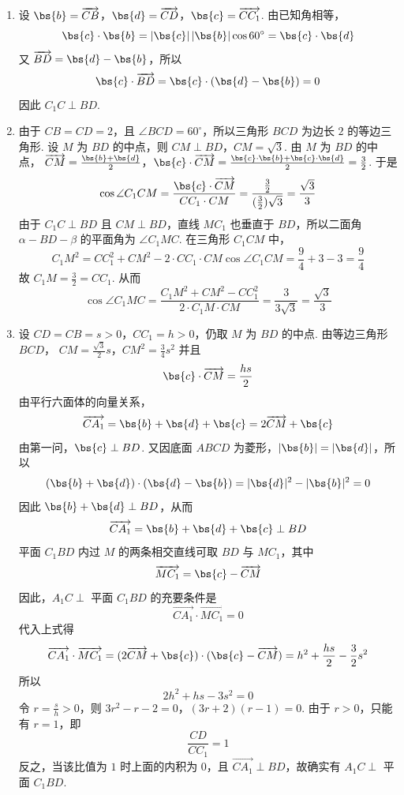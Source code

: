 \begin{solution}
\begin{enumerate}
\item 设 \(\bs{b}=\overrightarrow{CB}\)，\(\bs{d}=\overrightarrow{CD}\)，\(\bs{c}=\overrightarrow{CC_1}\). 由已知角相等，
\[
\bs{c}\cdot\bs{b}=|\bs{c}|\,|\bs{b}|\cos60^\circ=\bs{c}\cdot\bs{d}
\]
又 \(\overrightarrow{BD}=\bs{d}-\bs{b}\)，所以
\[
\bs{c}\cdot\overrightarrow{BD}=\bs{c}\cdot(\bs{d}-\bs{b})=0
\]
因此 \(C_1C\perp BD\).

\item 由于 \(CB=CD=2\)，且 \(\angle BCD=60^\circ\)，所以三角形 \(BCD\) 为边长 \(2\) 的等边三角形. 设 \(M\) 为 \(BD\) 的中点，则
\(CM\perp BD\)，\(CM=\sqrt{3}\).
由 \(M\) 为 \(BD\) 的中点，
\(\overrightarrow{CM}=\frac{\bs{b}+\bs{d}}{2}\)，\(\bs{c}\cdot\overrightarrow{CM}=\frac{\bs{c}\cdot\bs{b}+\bs{c}\cdot\bs{d}}{2}=\frac{3}{2}\).
于是
\[
\cos\angle C_1CM=\frac{\bs{c}\cdot\overrightarrow{CM}}{CC_1\cdot CM}
=\frac{\frac{3}{2}}{(\frac{3}{2})\sqrt{3}}=\frac{\sqrt{3}}{3}
\]
由于 \(C_1C\perp BD\) 且 \(CM\perp BD\)，直线 \(MC_1\) 也垂直于 \(BD\)，所以二面角 \(\alpha-BD-\beta\) 的平面角为 \(\angle C_1MC\). 在三角形 \(C_1CM\) 中，
\[
C_1M^2=CC_1^2+CM^2-2\cdot CC_1\cdot CM\cos\angle C_1CM
=\frac94+3-3=\frac94
\]
故 \(C_1M=\frac32=CC_1\). 从而
\[
\cos\angle C_1MC=\frac{C_1M^2+CM^2-CC_1^2}{2\cdot C_1M\cdot CM}
=\frac{3}{3\sqrt{3}}=\frac{\sqrt{3}}{3}
\]

\item 设 \(CD=CB=s>0\)，\(CC_1=h>0\)，仍取 \(M\) 为 \(BD\) 的中点. 由等边三角形 \(BCD\)，
\(CM=\frac{\sqrt{3}}{2}s\)，\(CM^2=\frac34s^2\)
并且
\[
\bs{c}\cdot\overrightarrow{CM}=\frac{hs}{2}
\]
由平行六面体的向量关系，
\[
\overrightarrow{CA_1}=\bs{b}+\bs{d}+\bs{c}=2\overrightarrow{CM}+\bs{c}
\]
由第一问，\(\bs{c}\perp BD\). 又因底面 \(ABCD\) 为菱形，\(|\bs{b}|=|\bs{d}|\)，所以
\[
(\bs{b}+\bs{d})\cdot(\bs{d}-\bs{b})=|\bs{d}|^2-|\bs{b}|^2=0
\]
因此 \(\bs{b}+\bs{d}\perp BD\)，从而
\[
\overrightarrow{CA_1}=\bs{b}+\bs{d}+\bs{c}\perp BD
\]
平面 \(C_1BD\) 内过 \(M\) 的两条相交直线可取 \(BD\) 与 \(MC_1\)，其中
\[
\overrightarrow{MC_1}=\bs{c}-\overrightarrow{CM}
\]
因此，\(A_1C\perp\) 平面 \(C_1BD\) 的充要条件是
\[
\overrightarrow{CA_1}\cdot\overrightarrow{MC_1}=0
\]
代入上式得
\[
\overrightarrow{CA_1}\cdot\overrightarrow{MC_1}
=(2\overrightarrow{CM}+\bs{c})\cdot(\bs{c}-\overrightarrow{CM})
=h^2+\frac{hs}{2}-\frac32s^2
\]
所以
\[
2h^2+hs-3s^2=0
\]
令 \(r=\frac{s}{h}>0\)，则
\(3r^2-r-2=0\)，\((3r+2)(r-1)=0\).
由于 \(r>0\)，只能有 \(r=1\)，即
\[
\frac{CD}{CC_1}=1
\]
反之，当该比值为 \(1\) 时上面的内积为 \(0\)，且 \(\overrightarrow{CA_1}\perp BD\)，故确实有 \(A_1C\perp\) 平面 \(C_1BD\).
\end{enumerate}
\end{solution}

